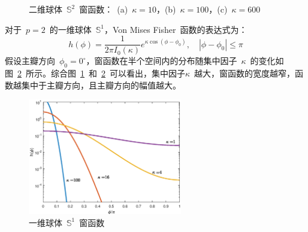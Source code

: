 \begin{figure}[H]
\centering
{}
\hfill
{}
\hfill
{}
\caption{二维球体~$\mathbb{S}^{2}$~窗函数：~(a)~$\kappa=10$，(b)~$\kappa=100$，(c)~$\kappa=600$}
\label{fig:Fishon_3D}
\end{figure}

对于~$p=2$~的一维球体~$\mathbb{S}^{1}$，Von Mises Fisher~函数的表达式为：
\begin{equation}
h(\phi)=\frac{1}{2 \pi I_{0}(\kappa)} e^{\kappa \cos \left(\phi-\phi_{0}\right)}, \quad\left|\phi-\phi_{0}\right| \leq \pi
\end{equation}
假设主瓣方向~$\phi_{0}= 0^{\circ}$，窗函数在半个空间内的分布随集中因子~$\kappa$~的变化如图~\ref{fig:Fishon_2D}~所示。综合图~\ref{fig:Fishon_3D}~和~\ref{fig:Fishon_2D}~可以看出，集中因子$\kappa$~越大，窗函数的宽度越窄，函数越集中于主瓣方向，且主瓣方向的幅值越大。
\begin{figure}[!h]
\centering
\includegraphics[width=0.6\textwidth]{figure/chapter4/FishVon_2D}
\caption{一维球体~$\mathbb{S}^{1}$~窗函数 }
\label{fig:Fishon_2D}
\end{figure}

